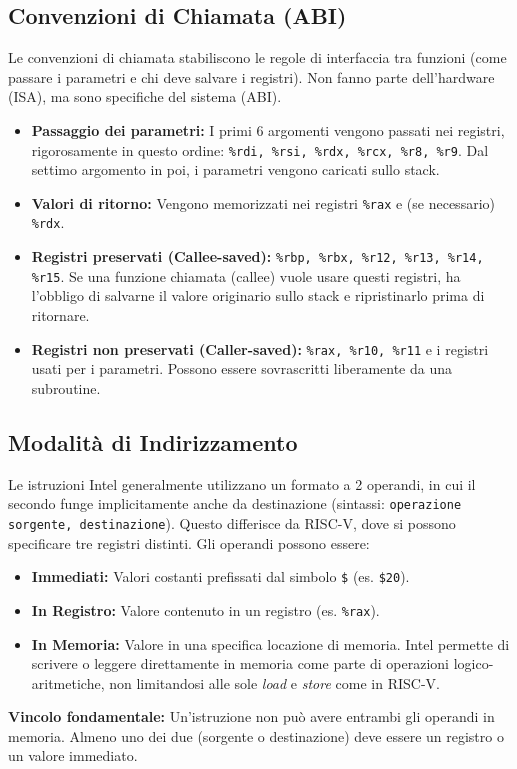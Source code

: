 \documentclass[12pt, a4paper]{article}
\begin{document}
\subsection{Convenzioni di Chiamata (ABI)}
Le convenzioni di chiamata stabiliscono le regole di interfaccia tra funzioni (come passare i parametri e chi deve salvare i registri). Non fanno parte dell'hardware (ISA), ma sono specifiche del sistema (ABI).
\begin{itemize}
    \item \textbf{Passaggio dei parametri:} I primi 6 argomenti vengono passati nei registri, rigorosamente in questo ordine: \texttt{\%rdi, \%rsi, \%rdx, \%rcx, \%r8, \%r9}. Dal settimo argomento in poi, i parametri vengono caricati sullo stack.
    \item \textbf{Valori di ritorno:} Vengono memorizzati nei registri \texttt{\%rax} e (se necessario) \texttt{\%rdx}.
    \item \textbf{Registri preservati (Callee-saved):} \texttt{\%rbp, \%rbx, \%r12, \%r13, \%r14, \%r15}. Se una funzione chiamata (callee) vuole usare questi registri, ha l'obbligo di salvarne il valore originario sullo stack e ripristinarlo prima di ritornare.
    \item \textbf{Registri non preservati (Caller-saved):} \texttt{\%rax, \%r10, \%r11} e i registri usati per i parametri. Possono essere sovrascritti liberamente da una subroutine.
\end{itemize}

\subsection{Modalità di Indirizzamento}
Le istruzioni Intel generalmente utilizzano un formato a 2 operandi, in cui il secondo funge implicitamente anche da destinazione (sintassi: \texttt{operazione sorgente, destinazione}). Questo differisce da RISC-V, dove si possono specificare tre registri distinti.
Gli operandi possono essere:
\begin{itemize}
    \item \textbf{Immediati:} Valori costanti prefissati dal simbolo \texttt{\$} (es. \texttt{\$20}).
    \item \textbf{In Registro:} Valore contenuto in un registro (es. \texttt{\%rax}).
    \item \textbf{In Memoria:} Valore in una specifica locazione di memoria. Intel permette di scrivere o leggere direttamente in memoria come parte di operazioni logico-aritmetiche, non limitandosi alle sole \textit{load} e \textit{store} come in RISC-V.
\end{itemize}
\textbf{Vincolo fondamentale:} Un'istruzione non può avere entrambi gli operandi in memoria. Almeno uno dei due (sorgente o destinazione) deve essere un registro o un valore immediato.
\end{document}
